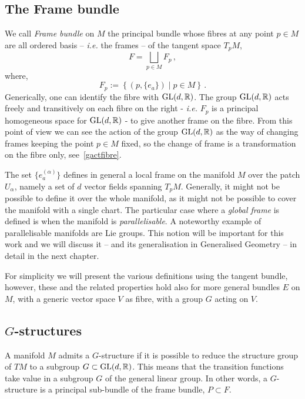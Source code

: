 \documentclass[debug]{phd}
\begin{document}
				\subsection{The Frame bundle}
				We call \emph{Frame bundle} on $M$ the principal bundle whose fibres at any point $p \in M$ are all ordered basis -- \emph{i.e.} the frames -- of the tangent space $T_p M$, 
						\begin{equation}\label{framebund}
							F = \bigsqcup_{p \in M} F_p\, ,
						\end{equation}
				where,
						\begin{equation}
							F_p := \left\{ (p, \{ e_a \}) \mid p \in M \right\}\, .
						\end{equation}
				Generically, one can identify the fibre with $\mathrm{GL}(d,\mathbb{R})$.
				The group $\mathrm{GL}(d,\mathbb{R})$ acts freely and transitively on each fibre on the right - \emph{i.e.} $F_p$ is a principal homogeneous space for $\mathrm{GL}(d,\mathbb{R})$ - to give another frame on the fibre. 
				From this point of view we can see the action of the group $\mathrm{GL}(d,\mathbb{R})$ as the way of changing frames keeping the point $p \in M$ fixed, so the change of frame is a transformation on the fibre only, see~\cref{gactfibre}.
				
				The set $\{e^{(\alpha)}_a\}$ defines in general a local frame on the manifold $M$ over the patch $U_{\alpha}$, namely a set of $d$ vector fields spanning $T_p M$. 
				Generally, it might not be possible to define it over the whole manifold, as it might not be possible to cover the manifold with a single chart.
				The particular case where a \emph{global frame} is defined is when the manifold is \emph{parallelisable}. 
				A noteworthy example of parallelisable manifolds are Lie groups. 
				This notion will be important for this work and we will discuss it -- and its generalisation in Generalised Geometry -- in detail in the next chapter.
				
				For simplicity we will present the various definitions using the tangent bundle, however, these and the related properties hold also for more general bundles $E$ on $M$, with a generic vector space $V$ as fibre, with a group $G$ acting on $V$.
			
			\subsection{\texorpdfstring{$G$-structures}{G-structures}}
					A manifold $M$	 admits a $G$-structure if it is possible to reduce the structure group of $TM$ to a subgroup $G \subset \mathrm{GL}(d, \mathbb{R})$.
					This means that the transition functions take value in a subgroup $G$ of the general linear group.
					In other words, a $G$-structure is a principal sub-bundle of the frame bundle, $P \subset F$.
					
\end{document}

